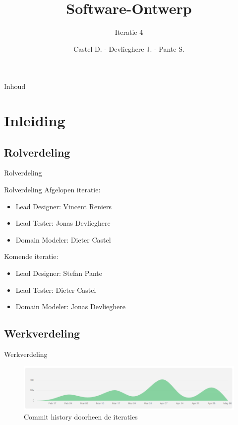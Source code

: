 \documentclass[t]{beamer}
\title{Software-Ontwerp}
\subtitle{Iteratie 4}
\author{Castel D. - Devlieghere J. - Pante S.}
\institute{KU Leuven}
\begin{document}
\frame{\titlepage} 
\begin{frame}{Inhoud}
\begin{multicols}{2}
\tableofcontents
\end{multicols}
\end{frame}



\section{Inleiding} 

\subsection{Rolverdeling}
\begin{frame}{Rolverdeling}
\begin{multicols}{2}
\tableofcontents[currentsection]
\end{multicols}
\end{frame}

\begin{frame}{Rolverdeling}
Afgelopen iteratie:
\begin{itemize}
	\item Lead Designer: Vincent Reniers
	\item Lead Tester: Jonas Devlieghere
	\item Domain Modeler: Dieter Castel
\end{itemize}
Komende iteratie:
\begin{itemize}
	\item Lead Designer: Stefan Pante
	\item Lead Tester: Dieter Castel
	\item Domain Modeler: Jonas Devlieghere
\end{itemize}
\end{frame}

\subsection{Werkverdeling}

\begin{frame}{Werkverdeling}
\begin{figure}[h!]
	\center
	\includegraphics[width= 0.9\linewidth]{img/github.png}
	\caption{Commit history doorheen de iteraties}
\end{figure}

\end{frame}
\end{document}
